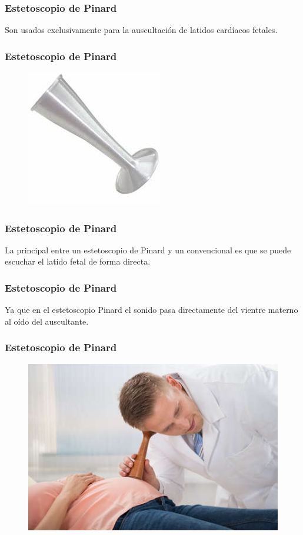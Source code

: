 \documentclass[14pt]{beamer}
\begin{document}
\begin{frame}
\frametitle{Estetoscopio de Pinard}
Son usados exclusivamente para la auscultación de latidos cardíacos fetales.
\end{frame}
\begin{frame}
\frametitle{Estetoscopio de Pinard}
\begin{figure}
    \centering
    \includegraphics[scale=0.75]{Imagenes/Estetoscopio_01.jpg}
\end{figure}
\end{frame}
\begin{frame}
\frametitle{Estetoscopio de Pinard}
La principal  entre un estetoscopio de Pinard y un convencional \pause es que se puede escuchar el latido fetal de forma directa.
\end{frame}
\begin{frame}
\frametitle{Estetoscopio de Pinard}
Ya que en el estetoscopio Pinard el sonido pasa directamente del vientre materno al oído del auscultante.
\end{frame}
\begin{frame}
\frametitle{Estetoscopio de Pinard}
\vspace*{-1cm}
\begin{figure}
    \centering
    \includegraphics[scale=0.5]{Imagenes/Estetoscopio_02.jpg}
\end{figure}
\end{frame}
\end{document}
